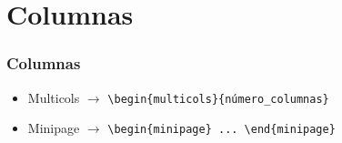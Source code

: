 \section{Columnas}

\begin{frame}[fragile]
\frametitle{Columnas}
\begin{itemize}
    \item Multicols $\rightarrow$ \verb|\begin{multicols}{número_columnas}| 
    \item Minipage  $\rightarrow$ \verb|\begin{minipage} ... \end{minipage}| 
\end{itemize}



\end{frame}
